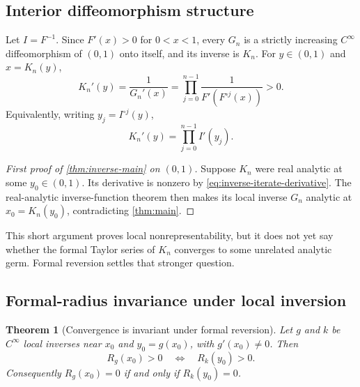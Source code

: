 \documentclass[11pt,oneside]{article}
\newtheorem{theorem}{Theorem}[section]
\theoremstyle{definition}
\theoremstyle{remark}
\newcommand{\comp}{\mathbin{\circ}}
\begin{document}
\subsection{Interior diffeomorphism structure}

Let $I=F^{-1}$.  Since $F'(x)>0$ for $0<x<1$, every $G_n$ is a strictly increasing
$C^\infty$ diffeomorphism of $(0,1)$ onto itself, and its inverse is $K_n$.  For
$y\in(0,1)$ and $x=K_n(y)$,
\begin{equation}
 K_n'(y)=\frac{1}{G_n'(x)}
 =\prod_{j=0}^{n-1}\frac{1}{F'(F^{\comp j}(x))}>0.
 \label{eq:inverse-iterate-derivative}
\end{equation}
Equivalently, writing $y_j=I^{\comp j}(y)$,
\begin{equation}
 K_n'(y)=\prod_{j=0}^{n-1} I'(y_j).
 \label{eq:inverse-product-slope}
\end{equation}

\begin{proof}[First proof of \cref{thm:inverse-main} on $(0,1)$]
Suppose $K_n$ were real analytic at some $y_0\in(0,1)$.  Its derivative is nonzero by
\eqref{eq:inverse-iterate-derivative}.  The real-analytic inverse-function theorem then
makes its local inverse $G_n$ analytic at $x_0=K_n(y_0)$, contradicting
\cref{thm:main}.
\end{proof}

This short argument proves local nonrepresentability, but it does not yet say whether
the formal Taylor series of $K_n$ converges to some unrelated analytic germ.  Formal
reversion settles that stronger question.

\subsection{Formal-radius invariance under local inversion}

\begin{theorem}[Convergence is invariant under formal reversion]
\label{thm:formal-reversion}
Let $g$ and $k$ be $C^\infty$ local inverses near $x_0$ and $y_0=g(x_0)$, with
$g'(x_0)\ne0$.  Then
\begin{equation}
 R_g(x_0)>0\quad\Longleftrightarrow\quad R_k(y_0)>0.
 \label{eq:radius-invariance}
\end{equation}
Consequently $R_g(x_0)=0$ if and only if $R_k(y_0)=0$.
\end{theorem}
\end{document}
